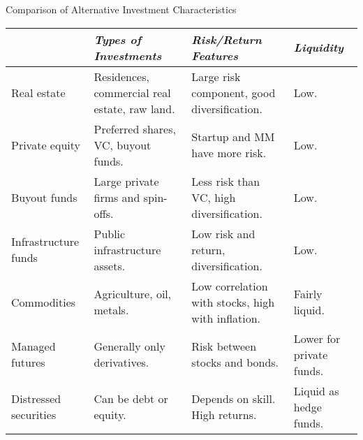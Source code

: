 \documentclass[../custom]{flashcards}
\begin{document}
\begin{flashcard}{Comparison of Alternative Investment Characteristics}
    \begin{tabular}{
        >{\raggedright}p{.8in}
        >{\raggedright}p{1.2in}
        >{\raggedright}p{1.2in}
        >{\raggedright\arraybackslash}p{1in}}
        \toprule
        & \textit{Types of Investments} & \textit{Risk/Return Features} & \textit{Liquidity}\\ \midrule
        Real estate &
        Residences, commercial real estate, raw land. &
        Large risk component, good diversification. &
        Low.\\ \midrule
        Private equity &
        Preferred shares, VC, buyout funds. &
        Startup and MM have more risk. &
        Low.\\ \midrule
        Buyout funds &
        Large private firms and spin-offs. &
        Less risk than VC, high diversification. &
        Low. \\ \midrule
        Infrastructure funds &
        Public infrastructure assets. &
        Low risk and return, diversification. &
        Low. \\ \midrule
        Commodities &
        Agriculture, oil, metals. &
        Low correlation with stocks, high with inflation. &
        Fairly liquid.\\ \midrule
        Managed futures &
        Generally only derivatives. &
        Risk between stocks and bonds. &
        Lower for private funds.\\ \midrule
        Distressed securities &
        Can be debt or equity. &
        Depends on skill. High returns. &
        Liquid as hedge funds.\\ \bottomrule
    \end{tabular}
\end{flashcard}
\end{document}
